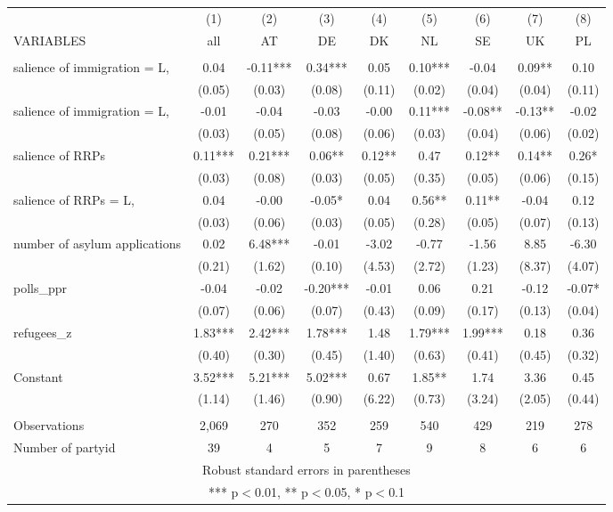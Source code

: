 \documentclass[]{article}
\begin{document}
\begin{tabular}{lcccccccc} \hline
 & (1) & (2) & (3) & (4) & (5) & (6) & (7) & (8) \\
VARIABLES & all & AT & DE & DK & NL & SE & UK & PL \\ \hline
 &  &  &  &  &  &  &  &  \\
salience of immigration = L, & 0.04 & -0.11*** & 0.34*** & 0.05 & 0.10*** & -0.04 & 0.09** & 0.10 \\
 & (0.05) & (0.03) & (0.08) & (0.11) & (0.02) & (0.04) & (0.04) & (0.11) \\
salience of immigration = L, & -0.01 & -0.04 & -0.03 & -0.00 & 0.11*** & -0.08** & -0.13** & -0.02 \\
 & (0.03) & (0.05) & (0.08) & (0.06) & (0.03) & (0.04) & (0.06) & (0.02) \\
salience of RRPs & 0.11*** & 0.21*** & 0.06** & 0.12** & 0.47 & 0.12** & 0.14** & 0.26* \\
 & (0.03) & (0.08) & (0.03) & (0.05) & (0.35) & (0.05) & (0.06) & (0.15) \\
salience of RRPs = L, & 0.04 & -0.00 & -0.05* & 0.04 & 0.56** & 0.11** & -0.04 & 0.12 \\
 & (0.03) & (0.06) & (0.03) & (0.05) & (0.28) & (0.05) & (0.07) & (0.13) \\
number of asylum applications & 0.02 & 6.48*** & -0.01 & -3.02 & -0.77 & -1.56 & 8.85 & -6.30 \\
 & (0.21) & (1.62) & (0.10) & (4.53) & (2.72) & (1.23) & (8.37) & (4.07) \\
polls\_ppr & -0.04 & -0.02 & -0.20*** & -0.01 & 0.06 & 0.21 & -0.12 & -0.07* \\
 & (0.07) & (0.06) & (0.07) & (0.43) & (0.09) & (0.17) & (0.13) & (0.04) \\
refugees\_z & 1.83*** & 2.42*** & 1.78*** & 1.48 & 1.79*** & 1.99*** & 0.18 & 0.36 \\
 & (0.40) & (0.30) & (0.45) & (1.40) & (0.63) & (0.41) & (0.45) & (0.32) \\
Constant & 3.52*** & 5.21*** & 5.02*** & 0.67 & 1.85** & 1.74 & 3.36 & 0.45 \\
 & (1.14) & (1.46) & (0.90) & (6.22) & (0.73) & (3.24) & (2.05) & (0.44) \\
 &  &  &  &  &  &  &  &  \\
Observations & 2,069 & 270 & 352 & 259 & 540 & 429 & 219 & 278 \\
 Number of partyid & 39 & 4 & 5 & 7 & 9 & 8 & 6 & 6 \\ \hline
\multicolumn{9}{c}{ Robust standard errors in parentheses} \\
\multicolumn{9}{c}{ *** p$<$0.01, ** p$<$0.05, * p$<$0.1} \\
\end{tabular}
\end{document}
